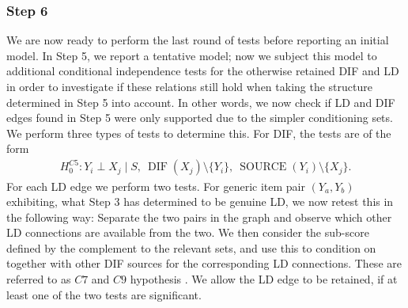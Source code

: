 \documentclass[a4project,12pt]{article}
\theoremstyle{examplestyle}
\theoremstyle{defstyle}
\theoremstyle{thmstyle}
\begin{document}
\subsubsection{Step 6}
We are now ready to perform the last round of tests before reporting an initial model. In Step 5, we report a tentative model; now we subject this model to additional conditional independence tests for the otherwise retained DIF and LD in order to investigate if these relations still hold when taking the structure determined in Step 5 into account. In other words, we now check if LD and DIF edges found in Step 5 were only supported due to the simpler conditioning sets. \\
We perform three types of tests to determine this. For DIF, the tests are of the form
\begin{align}
    H_0^{C5}: Y_i \perp X_j
    \mid
    S,\ \operatorname{DIF}(X_j)\setminus\{Y_i\},\
    \operatorname{SOURCE}(Y_i)\setminus\{X_j\}. \label{C5}
\end{align}
For each LD edge we perform two tests. For generic item pair $(Y_a,Y_b)$ exhibiting, what Step 3 has determined to be genuine LD, we now retest this in the following way: Separate the two pairs in the graph and observe which other LD connections are available from the two. We then consider the sub-score defined by the complement to the relevant sets, and use this to condition on together with other DIF sources for the corresponding LD connections. These are referred to as $C7$ and $C9$ hypothesis \cite{Kreiner_Christensen_2011}. We allow the LD edge to be retained, if at least one of the two tests are significant. 
\end{document}
